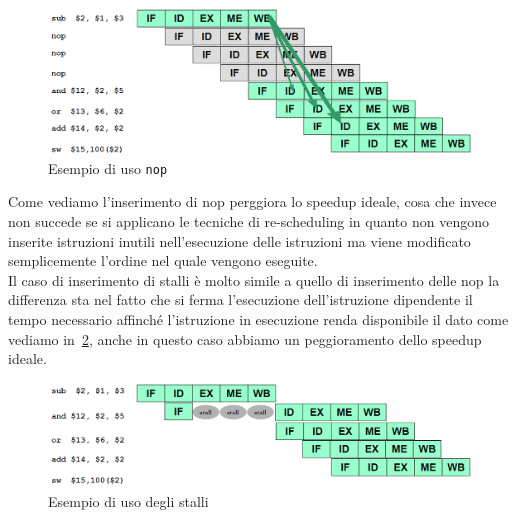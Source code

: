 \begin{figure}[htb]
\centering
\includegraphics[scale=0.45]{img/nop.png}
\caption{Esempio di uso \texttt{nop}}\label{fig:nop}
\end{figure}
Come vediamo l'inserimento di nop perggiora lo speedup ideale, cosa che invece non succede se si applicano le tecniche di re-scheduling in quanto non vengono inserite istruzioni inutili nell'esecuzione  delle istruzioni ma viene modificato semplicemente l'ordine nel quale vengono eseguite.\\
Il caso di inserimento di stalli è molto simile a quello di inserimento delle nop la differenza sta nel fatto che si ferma l'esecuzione dell'istruzione dipendente il tempo necessario affinché l'istruzione in esecuzione renda disponibile il dato come vediamo in \figurename\,\ref{fig:stall}, anche in questo caso abbiamo un peggioramento dello speedup ideale.
\begin{figure}[htb]
\centering
\includegraphics[scale=0.45]{img/stall.png}
\caption{Esempio di uso degli stalli}\label{fig:stall}
\end{figure}
